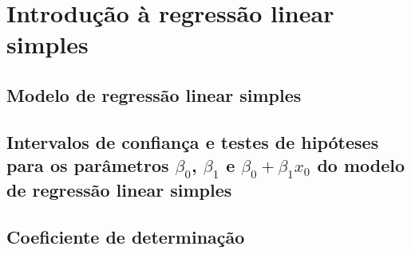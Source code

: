 \documentclass[11pt, a4paper]{article}
\begin{document}
\vspace{20pt}
\section{Introdução à regressão linear simples}

\subsection{Modelo de regressão linear simples}

\subsection{Intervalos de confiança e testes de hipóteses para os parâmetros $\beta_0$, $\beta_1$ e $\beta_0 + \beta_1x_0$ do modelo de regressão linear simples}

\subsection{Coeficiente de determinação}
\end{document}
